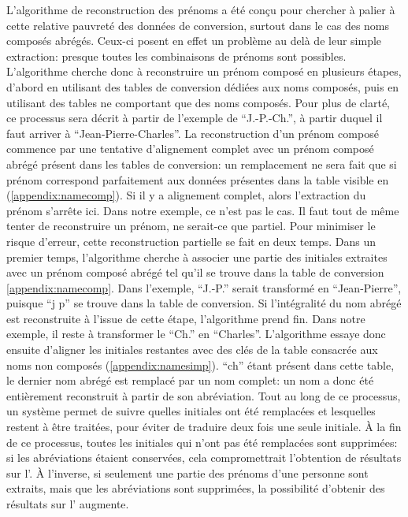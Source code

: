 L'algorithme de reconstruction des prénoms a été conçu pour chercher à palier à cette relative pauvreté des données de conversion, surtout dans le cas des noms composés abrégés. Ceux-ci posent en effet un problème au delà de leur simple extraction: presque toutes les combinaisons de prénoms sont possibles. L'algorithme cherche donc à reconstruire un prénom composé en plusieurs étapes, d'abord en utilisant des tables de conversion dédiées aux noms composés, puis en utilisant des tables ne comportant que des noms composés. Pour plus de clarté, ce processus sera décrit à partir de l'exemple de \enquote{J.-P.-Ch.}, à partir duquel il faut arriver à \enquote{Jean-Pierre-Charles}. La reconstruction d'un prénom composé commence par une tentative d'alignement complet avec un prénom composé abrégé présent dans les tables de conversion: un remplacement ne sera fait que si prénom correspond parfaitement aux données présentes dans la table visible en (\ref{appendix:namecomp}). Si il y a alignement complet, alors l'extraction du prénom s'arrête ici. Dans notre exemple, ce n'est pas le cas. Il faut tout de même tenter de reconstruire un prénom, ne serait-ce que partiel. Pour minimiser le risque d'erreur, cette reconstruction partielle se fait en deux temps. Dans un premier temps, l'algorithme cherche à associer une partie des initiales extraites avec un prénom composé abrégé tel qu'il se trouve dans la table de conversion \ref{appendix:namecomp}. Dans l'exemple, \enquote{J.-P.} serait transformé en \enquote{Jean-Pierre}, puisque \enquote{j p} se trouve dans la table de conversion. Si l'intégralité du nom abrégé est reconstruite à l'issue de cette étape, l'algorithme prend fin. Dans notre exemple, il reste à transformer le \enquote{Ch.} en \enquote{Charles}. L'algorithme essaye donc ensuite d'aligner les initiales restantes avec des clés de la table consacrée aux noms non composés (\ref{appendix:namesimp}). \enquote{ch} étant présent dans cette table, le dernier nom abrégé est remplacé par un nom complet: un nom a donc été entièrement reconstruit à partir de son abréviation. Tout au long de ce processus, un système permet de suivre quelles initiales ont été remplacées et lesquelles restent à être traitées, pour éviter de traduire deux fois une seule initiale. À la fin de ce processus, toutes les initiales qui n'ont pas été remplacées sont supprimées: si les abréviations étaient conservées, cela compromettrait l'obtention de résultats sur l'\api{}. À l'inverse, si seulement une partie des prénoms d'une personne sont extraits, mais que les abréviations sont supprimées, la possibilité d'obtenir des résultats sur l'\api{} augmente.

